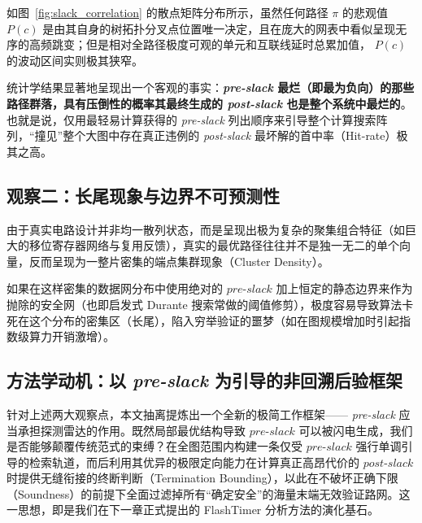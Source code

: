 如图~\ref{fig:slack_correlation} 的散点矩阵分布所示，虽然任何路径 $\pi$ 的悲观值 $P(c)$ 是由其自身的树拓扑分叉点位置唯一决定，且在庞大的网表中看似呈现无序的高频跳变；但是相对全路径极度可观的单元和互联线延时总累加值， $P(c)$ 的波动区间实则极其狭窄。

统计学结果显著地呈现出一个客观的事实：\textbf{\textit{pre-slack} 最烂（即最为负向）的那些路径群落，具有压倒性的概率其最终生成的 \textit{post-slack} 也是整个系统中最烂的}。也就是说，仅用最轻易计算获得的 \textit{pre-slack} 列出顺序来引导整个计算搜索阵列，“撞见”整个大图中存在真正违例的 \textit{post-slack} 最坏解的首中率（Hit-rate）极其之高。

\subsection{观察二：长尾现象与边界不可预测性}
由于真实电路设计并非均一散列状态，而是呈现出极为复杂的聚集组合特征（如巨大的移位寄存器网络与复用反馈），真实的最优路径往往并不是独一无二的单个向量，反而呈现为一整片密集的端点集群现象（Cluster Density）。

如果在这样密集的数据网分布中使用绝对的 $pre\text{-}slack$ 加上恒定的静态边界来作为抛除的安全网（也即启发式 Durante 搜索常做的阈值修剪），极度容易导致算法卡死在这个分布的密集区（长尾），陷入穷举验证的噩梦（如在图规模增加时引起指数级算力开销激增）。

\subsection{方法学动机：以 \textit{pre-slack} 为引导的非回溯后验框架}
针对上述两大观察点，本文抽离提炼出一个全新的极简工作框架—— \textit{ pre-slack } 应当承担探测雷达的作用。既然局部最优结构导致 $pre\text{-}slack$ 可以被闪电生成，我们是否能够颠覆传统范式的束缚？在全图范围内构建一条仅受 $pre\text{-}slack$ 强行单调引导的检索轨道，而后利用其优异的极限定向能力在计算真正高昂代价的 $post\text{-}slack$ 时提供无缝衔接的终断判断（Termination Bounding），以此在不破坏正确下限（Soundness）的前提下全面过滤掉所有“确定安全”的海量末端无效验证路网。这一思想，即是我们在下一章正式提出的 FlashTimer 分析方法的演化基石。